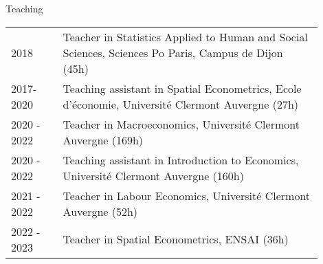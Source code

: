 \documentclass{resume} %
\begin{document}
\begin{rSection}{Teaching}
\begin{table}[H]
{\def\arraystretch{1.5}\tabcolsep=0pt
\begin{tabular}{p{0.15\linewidth}p{0.75\linewidth}}
2018 &  Teacher in Statistics Applied to Human and Social Sciences, Sciences Po Paris, Campus de Dijon (45h)\\
2017-2020 &  Teaching assistant in Spatial Econometrics, Ecole d'économie, Université Clermont Auvergne (27h)\\
2020 - 2022 & Teacher in Macroeconomics, Université Clermont Auvergne (169h)\\
2020 - 2022 & Teaching assistant in Introduction to Economics, Université Clermont Auvergne (160h)\\

2021 - 2022 & Teacher in Labour Economics, Université Clermont Auvergne (52h)\\
2022 - 2023 &  Teacher in Spatial Econometrics, ENSAI (36h)\\
\end{tabular}%
}
\end{table}
\end{rSection}
\vspace*{-7mm}
\end{document}
